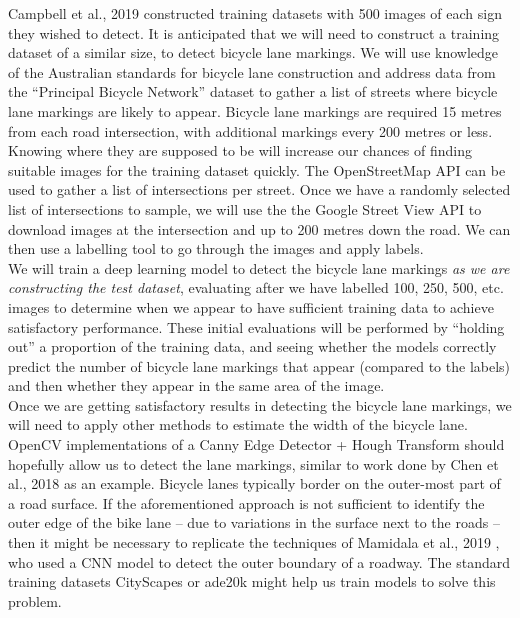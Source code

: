 \documentclass{article}
\begin{document}
Campbell et al., 2019 \cite{CAMPBELL2019101350} constructed training datasets with 500 images of each sign they wished to detect.  It is anticipated that we will need to construct a training dataset of a similar size, to detect bicycle lane markings.  We will use knowledge of the Australian standards for bicycle lane construction \cite{as1742} and address data from the ``Principal Bicycle Network'' dataset \cite{PrincipalBicycleNetwork} to gather a list of streets where bicycle lane markings are likely to appear.  Bicycle lane markings are required 15 metres from each road intersection, with additional markings every 200 metres or less.  Knowing where they are supposed to be will increase our chances of finding suitable images for the training dataset quickly.  The OpenStreetMap API can be used to gather a list of intersections per street.  Once we have a randomly selected list of intersections to sample, we will use the the Google Street View API to download images at the intersection and up to 200 metres down the road.  We can then use a labelling tool to go through the images and apply labels. \\

We will train a deep learning model to detect the bicycle lane markings \textit{as we are constructing the test dataset}, evaluating after we have labelled 100, 250, 500, etc. images to determine when we appear to have sufficient training data to achieve satisfactory performance.  These initial evaluations will be performed by ``holding out'' a proportion of the training data, and  seeing whether the models correctly predict the number of bicycle lane markings that appear (compared to the labels) and then whether they appear in the same area of the image.  \\

Once we are getting satisfactory results in detecting the bicycle lane markings, we will need to apply other methods to estimate the width of the bicycle lane.  OpenCV implementations of a Canny Edge Detector + Hough Transform should hopefully allow us to detect the lane markings, similar to work done by Chen et al., 2018 \cite{7784064} as an example.  Bicycle lanes typically border on the outer-most part of a road surface.  If the aforementioned approach is not sufficient to identify the outer edge of the bike lane -- due to variations in the surface next to the roads -- then it might be necessary to replicate the techniques of Mamidala et al., 2019 \cite{8929655}, who used a CNN model to detect the outer boundary of a roadway.  The standard training datasets CityScapes \cite{Cordts_2016_CVPR} or ade20k \cite{ade20k} might help us train models to solve this problem. \\
\end{document}
